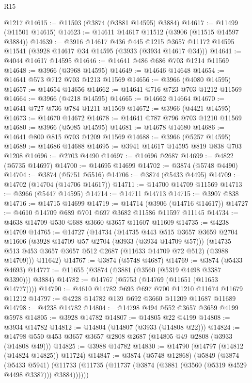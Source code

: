 \begin{lexlean}{R15}
\begin{coremodule}
    @1217
@14615 := @11503 (@3874 (@3881 @14595) @3884)
@14617 := @11499 (@11501 @14615)
@14623 := @14611 @14617 @11512 (@3906 (@11515 @14597 @3884))
@14639 := @3916
    @14617
    @436
    @445
    @1215
    @3657
    @11172
    @14595
    @11541
    (@3928 @14617 @34 @14595 (@3933 (@3934 @14617 @34)))
@14641 := @4044 @14617 @14595
@14646 := @14641 @486 @686 @703 @1214 @11569
@14648 := @3966 (@3968 @14595)
@14649 := @14646 @14648
@14654 := @14641 @573 @712 @703 @1213 @11569
@14656 := @3966 (@4080 @14595)
@14657 := @14654 @14656
@14662 := @14641 @716 @723 @703 @1212 @11569
@14664 := @3966 (@4218 @14595)
@14665 := @14662 @14664
@14670 := @14641 @727 @736 @784 @1211 @11569
@14672 := @3966 (@4421 @14595)
@14673 := @14670 @14672
@14678 := @14641 @787 @796 @703 @1210 @11569
@14680 := @3966 (@5085 @14595)
@14681 := @14678 @14680
@14686 := @14641 @800 @815 @703 @1209 @11569
@14688 := @3966 (@5257 @14595)
@14689 := @14686 @14688
@14695 := @3941 @14617 @14595 @819 @838 @703 @1208
@14696 := @2703 @4490
@14697 := @14696 @2687
@14699 := @4822 (@5735 @14697)
@14700 := @14695 @14699
@14702 := @3874 (@5748 @4490)
@14704 := @3874 (@5751 @5516)
@14706 := @3874 (@5433 @4495)
@14709 := @14702 (@14704 (@14706 @14617))
@14711 := @14700 @14709 @11569
@14713 := @3966 (@5447 @14595)
@14714 := @14711 @14713
@14715 := @3907 @838
@14716 := @14715 @14699
@14719 := @14714 (@3906 (@14716 @14617))
@14727 := @4610 @14709 @689 @701 @697 @3682 @11586 @11597 @11145
@14734 := @4638 @14709 @530 @688 @3660 @3657 @11607 @11609
@14735 := @4238 @14709
@14765 := @14727
    (@14734
      (@14735
        @443
        @515
        @3657
        @3659
        @2704
        @11606
        (@3928 @14709 @57 @2704 (@3933 (@3934 @14709 @57)))
        (@14735 @513 @453 @3657 @3657 @512 @2687 (@11633 @14709 @72 @512) (@3988 @14709)))
      @11642)
@14767 := @3874 (@5748 @4687)
@14769 := @3874 (@5433 @4693)
@14777 := @11655 (@3874 (@3881 (@3560 (@5319 @4498 @3387 @3390))) @3884)
@14782 := @14767 (@5753 (@14769 (@11651 (@11653 @14777))))
@14790 := @4610 @14782 @693 @697 @700 @11210 @11674 @11679 @11212
@14797 := @4228 @14782 @139 @692 @3660 @11209 @11687 @11689
@14798 := @4238 @14782
@14804 := @14798 @494 @552 @3657 @3659 @4199 @5978
@14805 := @3928 @14782
@14807 := @14805 @22 @4199
@14808 := @3934 @14782
@14812 := @14804 (@14807 (@3933 (@14808 @22)))
@14824 := @14798 @550 @453 @3657 @3657 @2808 @2687 (@14805 @49 @2808 (@3933 (@14808 @49)))
@14825 := @3988 @14782
@14830 := @14790 (@14797 (@14812 (@14824 @14825)) @11724)
@14847 := @3874
    (@5748 @12868)
    (@5849
      (@3874
        (@5433 @5941)
        (@11733 (@11735 (@11737 (@3874 (@3881 (@3560 (@5319 @4529 @4498 @3387))) @3884))))))

\end{coremodule}
\end{lexlean}

